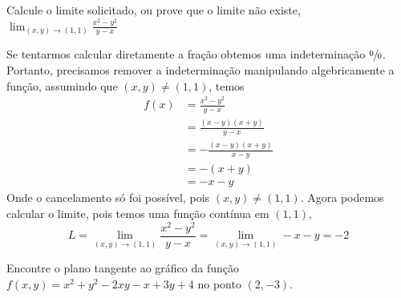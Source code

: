 \documentclass[a4paper,12pt,fleqn]{article}
\begin{document}

Calcule o limite solicitado, ou prove que o limite não existe,
\(
  \lim_{(x, y)\to(1, 1)} \frac{x^2 - y^2}{y-x}
\)

\begin{answer}
  Se tentarmos calcular diretamente a fração obtemos uma
  indeterminação $\sfrac{0}{0}$.
  Portanto, precisamos remover a indeterminação manipulando
  algebricamente a função,
  assumindo que $(x, y)\neq(1, 1)$, temos
  \begin{align*}
    f(x) & = \frac{x^2 - y^2}{y-x}  \\[2mm]
    & = \frac{(x-y)(x+y)}{y-x} \\[2mm]
    & = -\frac{(x-y)(x+y)}{x-y} \\[2mm]
    & = -(x+y) \\[2mm]
    & = -x-y
  \end{align*}
  Onde o cancelamento só foi possível, pois $(x, y)\neq(1, 1)$.
  Agora podemos calcular o limite, pois temos uma função contínua em $(1, 1)$,
  \[
    L
    = \lim_{(x, y)\to(1, 1)} \frac{x^2 - y^2}{y-x}
    = \lim_{(x, y)\to(1, 1)} -x-y = -2
  \]
  \clearpage
\end{answer}

Encontre o plano tangente ao gráfico da função
\(
  f(x, y) = x^2 + y^2 -2xy -x +3y + 4
\)
no ponto \((2, -3)\).
\end{document}

